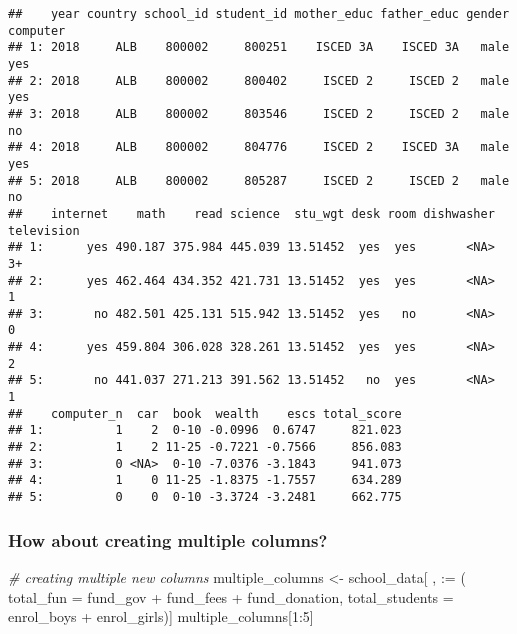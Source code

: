 \documentclass[
]{article}
\newenvironment{Shaded}{\begin{snugshade}}{\end{snugshade}}
\newcommand{\AttributeTok}[1]{\textcolor[rgb]{0.77,0.63,0.00}{#1}}
\newcommand{\CommentTok}[1]{\textcolor[rgb]{0.56,0.35,0.01}{\textit{#1}}}
\newcommand{\DecValTok}[1]{\textcolor[rgb]{0.00,0.00,0.81}{#1}}
\newcommand{\NormalTok}[1]{#1}
\newcommand{\OtherTok}[1]{\textcolor[rgb]{0.56,0.35,0.01}{#1}}
\newcommand{\SpecialCharTok}[1]{\textcolor[rgb]{0.00,0.00,0.00}{#1}}
\newcommand{\StringTok}[1]{\textcolor[rgb]{0.31,0.60,0.02}{#1}}
\begin{document}
\begin{verbatim}
##    year country school_id student_id mother_educ father_educ gender computer
## 1: 2018     ALB    800002     800251    ISCED 3A    ISCED 3A   male      yes
## 2: 2018     ALB    800002     800402     ISCED 2     ISCED 2   male      yes
## 3: 2018     ALB    800002     803546     ISCED 2     ISCED 2   male       no
## 4: 2018     ALB    800002     804776     ISCED 2    ISCED 3A   male      yes
## 5: 2018     ALB    800002     805287     ISCED 2     ISCED 2   male       no
##    internet    math    read science  stu_wgt desk room dishwasher television
## 1:      yes 490.187 375.984 445.039 13.51452  yes  yes       <NA>         3+
## 2:      yes 462.464 434.352 421.731 13.51452  yes  yes       <NA>          1
## 3:       no 482.501 425.131 515.942 13.51452  yes   no       <NA>          0
## 4:      yes 459.804 306.028 328.261 13.51452  yes  yes       <NA>          2
## 5:       no 441.037 271.213 391.562 13.51452   no  yes       <NA>          1
##    computer_n  car  book  wealth    escs total_score
## 1:          1    2  0-10 -0.0996  0.6747     821.023
## 2:          1    2 11-25 -0.7221 -0.7566     856.083
## 3:          0 <NA>  0-10 -7.0376 -3.1843     941.073
## 4:          1    0 11-25 -1.8375 -1.7557     634.289
## 5:          0    0  0-10 -3.3724 -3.2481     662.775
\end{verbatim}

\hypertarget{how-about-creating-multiple-columns}{%
\subsubsection{How about creating multiple
columns?}\label{how-about-creating-multiple-columns}}

\begin{Shaded}
\begin{Highlighting}[]
\CommentTok{\# creating multiple new columns}
\NormalTok{multiple\_columns }\OtherTok{\textless{}{-}}\NormalTok{ school\_data[ , }\StringTok{\textasciigrave{}}\AttributeTok{:=}\StringTok{\textasciigrave{}}\NormalTok{ (}
  \AttributeTok{total\_fun =}\NormalTok{ fund\_gov }\SpecialCharTok{+}\NormalTok{ fund\_fees }\SpecialCharTok{+}\NormalTok{ fund\_donation,  }\AttributeTok{total\_students =}\NormalTok{ enrol\_boys }\SpecialCharTok{+}\NormalTok{ enrol\_girls)]}
\NormalTok{multiple\_columns[}\DecValTok{1}\SpecialCharTok{:}\DecValTok{5}\NormalTok{]}
\end{Highlighting}
\end{Shaded}
\end{document}
